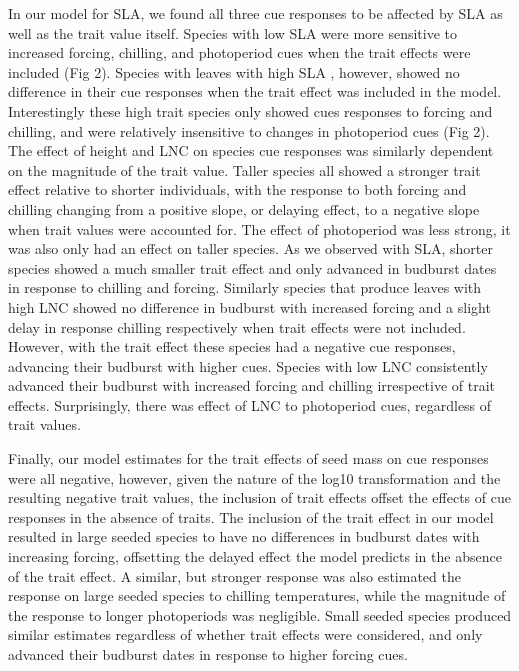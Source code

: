 \documentclass{article}\usepackage[]{graphicx}\usepackage[]{color}
\begin{document}
In our model for SLA, we found all three cue responses to be affected by SLA as well as the trait value itself. Species with low SLA were more sensitive to increased forcing, chilling, and photoperiod cues when the trait effects were included (Fig 2). Species with leaves with high SLA , however, showed no difference in their cue responses when the trait effect was included in the model. Interestingly these high trait species only showed cues responses to forcing and chilling, and were relatively insensitive to changes in photoperiod cues (Fig 2). The effect of height and LNC on species cue responses was similarly dependent on the magnitude of the trait value. Taller species all showed a stronger trait effect relative to shorter individuals, with the response to both forcing and chilling changing from a positive slope, or delaying effect, to a negative slope when trait values were accounted for. The effect of photoperiod was less strong, it was also only had an effect on taller species. As we observed with SLA, shorter species showed a much smaller trait effect and only advanced in budburst dates in response to chilling and forcing. Similarly species that produce leaves with high LNC showed no difference in budburst with increased forcing and a slight delay in response chilling respectively when trait effects were not included. However, with the trait effect these species had a negative cue responses, advancing their budburst with higher cues. Species with low LNC consistently advanced their budburst with increased forcing and chilling irrespective of trait effects. Surprisingly, there was effect of LNC to photoperiod cues, regardless of trait values.

Finally, our model estimates for the trait effects of seed mass on cue responses were all negative, however, given the nature of the log10 transformation and the resulting negative trait values, the inclusion of trait effects offset the effects of cue responses in the absence of traits. The inclusion of the trait effect in our model resulted in large seeded species to have no differences in budburst dates with increasing forcing, offsetting the delayed effect the model predicts in the absence of the trait effect. A similar, but stronger response was also estimated the response on large seeded species to chilling temperatures, while the magnitude of the response to longer photoperiods was negligible. Small seeded species produced similar estimates regardless of whether trait effects were considered, and only advanced their budburst dates in response to higher forcing cues. 
\end{document}
